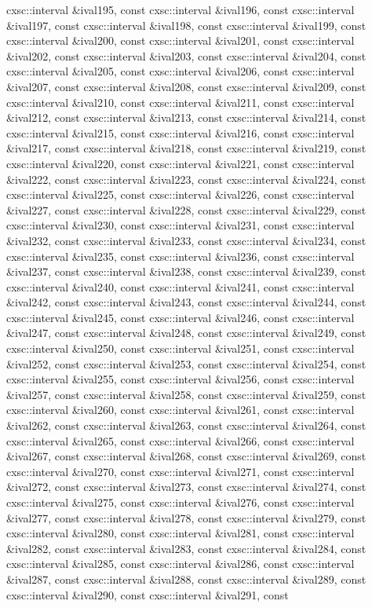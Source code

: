 \begin{DoxyCompactItemize}
cxsc\-::interval \&ival195, const cxsc\-::interval \&ival196, const cxsc\-::interval \&ival197, const cxsc\-::interval \&ival198, const cxsc\-::interval \&ival199, const cxsc\-::interval \&ival200, const cxsc\-::interval \&ival201, const cxsc\-::interval \&ival202, const cxsc\-::interval \&ival203, const cxsc\-::interval \&ival204, const cxsc\-::interval \&ival205, const cxsc\-::interval \&ival206, const cxsc\-::interval \&ival207, const cxsc\-::interval \&ival208, const cxsc\-::interval \&ival209, const cxsc\-::interval \&ival210, const cxsc\-::interval \&ival211, const cxsc\-::interval \&ival212, const cxsc\-::interval \&ival213, const cxsc\-::interval \&ival214, const cxsc\-::interval \&ival215, const cxsc\-::interval \&ival216, const cxsc\-::interval \&ival217, const cxsc\-::interval \&ival218, const cxsc\-::interval \&ival219, const cxsc\-::interval \&ival220, const cxsc\-::interval \&ival221, const cxsc\-::interval \&ival222, const cxsc\-::interval \&ival223, const cxsc\-::interval \&ival224, const cxsc\-::interval \&ival225, const cxsc\-::interval \&ival226, const cxsc\-::interval \&ival227, const cxsc\-::interval \&ival228, const cxsc\-::interval \&ival229, const cxsc\-::interval \&ival230, const cxsc\-::interval \&ival231, const cxsc\-::interval \&ival232, const cxsc\-::interval \&ival233, const cxsc\-::interval \&ival234, const cxsc\-::interval \&ival235, const cxsc\-::interval \&ival236, const cxsc\-::interval \&ival237, const cxsc\-::interval \&ival238, const cxsc\-::interval \&ival239, const cxsc\-::interval \&ival240, const cxsc\-::interval \&ival241, const cxsc\-::interval \&ival242, const cxsc\-::interval \&ival243, const cxsc\-::interval \&ival244, const cxsc\-::interval \&ival245, const cxsc\-::interval \&ival246, const cxsc\-::interval \&ival247, const cxsc\-::interval \&ival248, const cxsc\-::interval \&ival249, const cxsc\-::interval \&ival250, const cxsc\-::interval \&ival251, const cxsc\-::interval \&ival252, const cxsc\-::interval \&ival253, const cxsc\-::interval \&ival254, const cxsc\-::interval \&ival255, const cxsc\-::interval \&ival256, const cxsc\-::interval \&ival257, const cxsc\-::interval \&ival258, const cxsc\-::interval \&ival259, const cxsc\-::interval \&ival260, const cxsc\-::interval \&ival261, const cxsc\-::interval \&ival262, const cxsc\-::interval \&ival263, const cxsc\-::interval \&ival264, const cxsc\-::interval \&ival265, const cxsc\-::interval \&ival266, const cxsc\-::interval \&ival267, const cxsc\-::interval \&ival268, const cxsc\-::interval \&ival269, const cxsc\-::interval \&ival270, const cxsc\-::interval \&ival271, const cxsc\-::interval \&ival272, const cxsc\-::interval \&ival273, const cxsc\-::interval \&ival274, const cxsc\-::interval \&ival275, const cxsc\-::interval \&ival276, const cxsc\-::interval \&ival277, const cxsc\-::interval \&ival278, const cxsc\-::interval \&ival279, const cxsc\-::interval \&ival280, const cxsc\-::interval \&ival281, const cxsc\-::interval \&ival282, const cxsc\-::interval \&ival283, const cxsc\-::interval \&ival284, const cxsc\-::interval \&ival285, const cxsc\-::interval \&ival286, const cxsc\-::interval \&ival287, const cxsc\-::interval \&ival288, const cxsc\-::interval \&ival289, const cxsc\-::interval \&ival290, const cxsc\-::interval \&ival291, const 
\end{DoxyCompactItemize}
